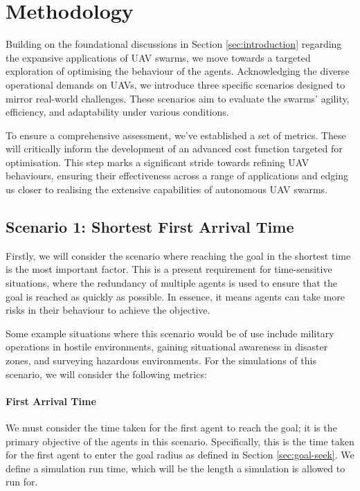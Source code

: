 \documentclass[12pt]{article}
\begin{document}
\newpage
\section{Methodology}
\label{sec:methodology}

Building on the foundational discussions in Section \ref{sec:introduction} regarding the expansive applications of UAV swarms, we move towards a targeted exploration of optimising the behaviour of the agents. Acknowledging the diverse operational demands on UAVs, we introduce three specific scenarios designed to mirror real-world challenges. These scenarios aim to evaluate the swarms' agility, efficiency, and adaptability under various conditions.

To ensure a comprehensive assessment, we've established a set of metrics. These will critically inform the development of an advanced cost function targeted for optimisation. This step marks a significant stride towards refining UAV behaviours, ensuring their effectiveness across a range of applications and edging us closer to realising the extensive capabilities of autonomous UAV swarms.

\subsection{Scenario 1: Shortest First Arrival Time}
Firstly, we will consider the scenario where reaching the goal in the shortest time is the most important factor. This is a present requirement for time-sensitive situations, where the redundancy of multiple agents is used to ensure that the goal is reached as quickly as possible. In essence, it means agents can take more risks in their behaviour to achieve the objective.

Some example situations where this scenario would be of use include military operations in hostile environments, gaining situational awareness in disaster zones, and surveying hazardous environments\cite{Srinath}. For the simulations of this scenario, we will consider the following metrics:

\paragraph{First Arrival Time} 
We must consider the time taken for the first agent to reach the goal; it is the primary objective of the agents in this scenario. Specifically, this is the time taken for the first agent to enter the goal radius as defined in Section \ref{sec:goal-seek}. We define a simulation run time, which will be the length a simulation is allowed to run for.
\end{document}
